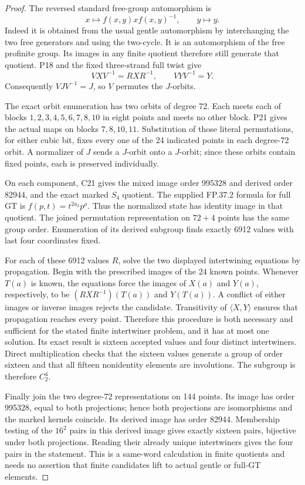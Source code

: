 \begin{proof}
The reversed standard free-group automorphism is
\[
            x\longmapsto f(x,y)x f(x,y)^{-1},
            \qquad y\longmapsto y.
\]
Indeed it is obtained from the usual gentle automorphism by
interchanging the two free generators and using the two-cycle.
It is an automorphism of the free profinite group.  Its images in
any finite quotient therefore still generate that quotient.
P18 and the fixed three-strand full twist give
\[
                VXV^{-1}=RXR^{-1},\qquad VYV^{-1}=Y.
\]
Consequently $VJV^{-1}=J$, so $V$ permutes the $J$-orbits.

The exact orbit enumeration has two orbits of degree 72.  Each
meets each of blocks $1,2,3,4,5,6,7,8,10$ in eight points and
meets no other block.  P21 gives the actual maps on blocks
$7,8,10,11$.  Substitution of those literal permutations, for
either cubic bit, fixes every one of the 24 indicated points in
each degree-72 orbit.  A normalizer of $J$ sends a $J$-orbit onto
a $J$-orbit; since these orbits contain fixed points, each is
preserved individually.

On each component, C21 gives the mixed image order 995328 and
derived order 82944, and the exact marked $S_4$ quotient.
The supplied FP.37.2 formula for full GT is
$f(p,t)=t^{2a_2}p^\rho$.  Thus the normalized state has identity
image in that quotient.  The joined permutation representation
on $72+4$ points has the same group order.  Enumeration of its
derived subgroup finds exactly 6912 values with last four
coordinates fixed.

For each of these 6912 values $R$, solve the two displayed
intertwining equations by propagation.  Begin with the prescribed
images of the 24 known points.  Whenever $T(a)$ is known, the
equations force the images of $X(a)$ and $Y(a)$, respectively,
to be $(RXR^{-1})(T(a))$ and $Y(T(a))$.  A conflict of either
images or inverse images rejects the candidate.  Transitivity
of $\langle X,Y\rangle$ ensures that propagation reaches every
point.  Therefore this procedure is both necessary and
sufficient for the stated finite intertwiner problem, and it
has at most one solution.  Its exact result is sixteen accepted
values and four distinct intertwiners.  Direct multiplication
checks that the sixteen values generate a group of order
sixteen and that all fifteen nonidentity elements are
involutions.  The subgroup is therefore $C_2^4$.

Finally join the two degree-72 representations on 144 points.
Its image has order 995328, equal to both projections; hence
both projections are isomorphisms and the marked kernels
coincide.  Its derived image has order 82944.  Membership
testing of the $16^2$ pairs in this derived image gives
exactly sixteen pairs, bijective under both projections.
Reading their already unique intertwiners gives the four pairs
in the statement.  This is a same-word calculation in finite
quotients and needs no assertion that finite candidates lift
to actual gentle or full-GT elements.
\end{proof}

